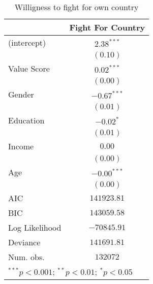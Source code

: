 
\begin{table}
\begin{center}
\begin{tabular}{l c}
\toprule
 & Fight For Country \\
\midrule
(intercept)    & $2.38^{***}$  \\
               & $(0.10)$      \\
Value Score    & $0.02^{***}$  \\
               & $(0.00)$      \\
Gender         & $-0.67^{***}$ \\
               & $(0.01)$      \\
Education      & $-0.02^{*}$   \\
               & $(0.01)$      \\
Income         & $0.00$        \\
               & $(0.00)$      \\
Age            & $-0.00^{***}$ \\
               & $(0.00)$      \\
\midrule
AIC            & $141923.81$   \\
BIC            & $143059.58$   \\
Log Likelihood & $-70845.91$   \\
Deviance       & $141691.81$   \\
Num. obs.      & $132072$      \\
\bottomrule
\multicolumn{2}{l}{\scriptsize{$^{***}p<0.001$; $^{**}p<0.01$; $^{*}p<0.05$}}
\end{tabular}
\caption{Willigness to fight for own country}
\label{FCreg}
\end{center}
\end{table}
